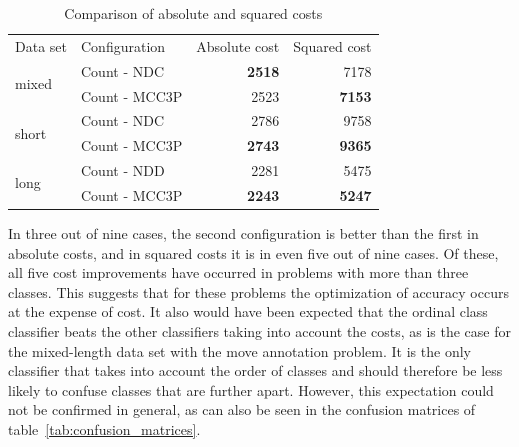 \documentclass[article,type=msc,colorback,accentcolor=tud7b]{tudthesis}
\begin{document}
\begin{table}[H]
{\begin{tabular}{| l | l | r | r |}
		\cline{1-4}
		Data set & Configuration & Absolute cost & Squared cost \\ \cline{1-4}
		\multirow{2}{*}{mixed} & Count - NDC & \textbf{2518} & 7178 \\ \cline{2-4}
		 & Count - MCC3P & 2523 & \textbf{7153} \\ \cline{1-4}
		\multirow{2}{*}{short} & Count - NDC & 2786 & 9758 \\ \cline{2-4}
		 & Count - MCC3P & \textbf{2743} & \textbf{9365} \\ \cline{1-4}
		\multirow{2}{*}{long} & Count - NDD & 2281 & 5475 \\ \cline{2-4}
		 & Count - MCC3P & \textbf{2243} & \textbf{5247} \\ \cline{1-4}
	  \end{tabular}
      }
      \caption{Comparison of absolute and squared costs}
      \label{tab:comparison_costs}
	\end{table}

    In three out of nine cases, the second configuration is better than the first in absolute costs, and in squared costs it is in even five out of nine cases. Of these, all five cost improvements have occurred in problems with more than three classes. This suggests that for these problems the optimization of accuracy occurs at the expense of cost. It also would have been expected that the ordinal class classifier beats the other classifiers taking into account the costs, as is the case for the mixed-length data set with the move annotation problem. It is the only classifier that takes into account the order of classes and should therefore be less likely to confuse classes that are further apart. However, this expectation could not be confirmed in general, as can also be seen in the confusion matrices of table~\ref{tab:confusion_matrices}.    
  \clearpage  
  
\end{document}
